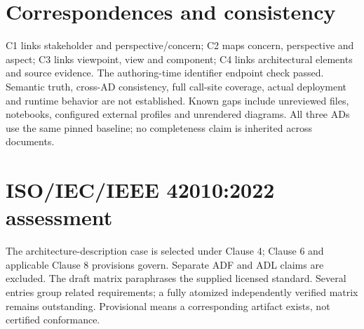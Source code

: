\documentclass[10pt,letterpaper]{article}
\begin{document}
\section{Correspondences and consistency}
C1 links stakeholder and perspective/concern; C2 maps concern, perspective and aspect; C3 links viewpoint, view and component; C4 links architectural elements and source evidence. The authoring-time identifier endpoint check passed. Semantic truth, cross-AD consistency, full call-site coverage, actual deployment and runtime behavior are not established. Known gaps include unreviewed files, notebooks, configured external profiles and unrendered diagrams. All three ADs use the same pinned baseline; no completeness claim is inherited across documents.
\section{ISO/IEC/IEEE 42010:2022 assessment}
The architecture-description case is selected under Clause 4; Clause 6 and applicable Clause 8 provisions govern. Separate ADF and ADL claims are excluded. The draft matrix paraphrases the supplied licensed standard. Several entries group related requirements; a fully atomized independently verified matrix remains outstanding. Provisional means a corresponding artifact exists, not certified conformance.
\end{document}
